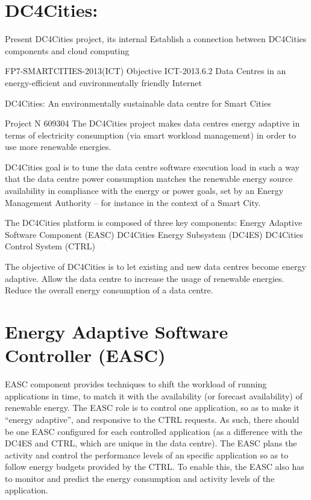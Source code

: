 \section{DC4Cities:}
Present DC4Cities project, its internal
Establish a connection between DC4Cities components and cloud computing

FP7-SMARTCITIES-2013(ICT)
Objective ICT-2013.6.2 
Data Centres in an energy-efficient and environmentally friendly Internet

DC4Cities: An environmentally sustainable data centre for Smart Cities

Project N 609304
The DC4Cities project makes data centres energy adaptive in terms of electricity consumption (via smart workload management) in order to use more renewable energies.

DC4Cities goal is to tune the data centre software execution load in such a way that the data centre power consumption matches the renewable energy source availability in compliance with the energy or power goals, set by an Energy Management Authority – for instance in the context of a Smart City.

The DC4Cities platform is composed of three key components:
Energy Adaptive Software Component (EASC)
DC4Cities Energy Subsystem (DC4ES) 
DC4Cities Control System (CTRL)

The objective of DC4Cities is to let existing and new data centres become energy adaptive. 
Allow the data centre to increase the usage of renewable energies.
Reduce the overall energy consumption of a data centre.

\section{Energy Adaptive Software Controller (EASC)}

EASC component provides techniques to shift the workload of running applications in time, to match it with the availability (or forecast availability) of renewable energy. The EASC role is to control one application, so as to make it “energy adaptive”, and responsive to the CTRL requests. As such, there should be one EASC configured for each controlled application (as a difference with the DC4ES and CTRL, which are unique in the data centre). The EASC plans the activity and control the performance levels of an specific application so as to follow energy budgets provided by the CTRL. To enable this, the EASC also has to monitor and predict the energy consumption and activity levels of the application.


